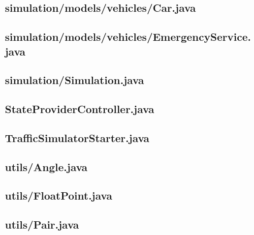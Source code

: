 \subsection{simulation/models/vehicles/Car.java}

\newpage
\subsection{simulation/models/vehicles/EmergencyService.java}

\newpage
\subsection{simulation/Simulation.java}

\newpage
\subsection{StateProviderController.java}

\newpage
\subsection{TrafficSimulatorStarter.java}

\newpage
\subsection{utils/Angle.java}

\newpage
\subsection{utils/FloatPoint.java}

\newpage
\subsection{utils/Pair.java}

\newpage
